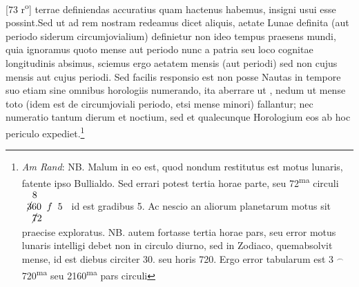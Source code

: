 [73 r\textsuperscript{o}] terrae definiendas accuratius quam hactenus habemus, insigni usui esse possint.\pend \pstart Sed ut ad rem nostram redeamus dicet aliquis, aetate Lunae\protect{} definita (aut periodo siderum circumjovialium) definietur non ideo tempus praesens mundi, quia ignoramus quoto mense aut periodo nunc a patria seu loco cognitae longitudinis\protect{} absimus, sciemus ergo aetatem mensis (aut periodi) sed non cujus mensis aut cujus periodi. Sed facilis responsio est non posse Nautas in tempore suo etiam sine omnibus horologiis\protect{} numerando, ita aberrare ut , nedum ut mense toto (idem est de circumjoviali periodo, etsi mense minori) fallantur; nec numeratio tantum dierum et noctium, sed et qualecunque Horologium\protect{} eos ab hoc periculo expediet.\footnote{\textit{Am Rand}: NB. Malum in eo est, quod nondum restitutus est motus lunaris, fatente ipso Bullialdo\protect{}. Sed errari potest tertia horae parte, seu 72\textsuperscript{ma} circuli $\protect\begin{array}{l} \hspace{5.5pt}8\\\cancel{3}60\hspace{5.5pt}f\hspace{5.5pt}5\\\hspace{5.5pt}\cancel{7}2\protect\end{array}$ 
id est gradibus 5. Ac nescio an aliorum planetarum motus sit praecise exploratus. NB. autem fortasse tertia horae pars, seu error motus lunaris intelligi debet non in circulo diurno, sed in Zodiaco\protect{}, quem\rightmoon \hspace{5.5pt}absolvit mense, id est diebus circiter 30. seu horis 720. Ergo error tabularum est 3 $^\smallfrown$ 720\textsuperscript{ma} seu 2160\textsuperscript{ma} pars circuli
}
